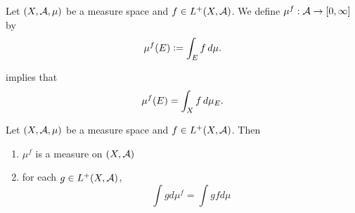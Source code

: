 \documentclass{book}
\begin{document}
	\begin{defn}  
		Let $(X, \mathcal{A}, \mu)$ be a measure space and $f \in L^+(X, \mathcal{A})$. We define $\mu^f: \mathcal{A} \rightarrow [0,\infty]$ by $$\mu^f(E) \vcentcolon= \int_E f \, d \mu.$$
	\end{defn}

	\begin{note}
		 implies that 
		$$\mu^f(E) = \int_X f \, d \mu_E.$$
	\end{note}
	
	\begin{ex}  
		Let $(X, \mathcal{A}, \mu)$ be a measure space and $f \in L^+(X, \mathcal{A})$.
		Then 
		\begin{enumerate}
			\item $\mu^f$ is a measure on $(X, \mathcal{A})$ 
			\item for each $g \in L^+(X, \mathcal{A})$, 
			$$\int g d\mu^f = \int g f d\mu$$
		\end{enumerate}
	\end{ex}
	
\end{document}
